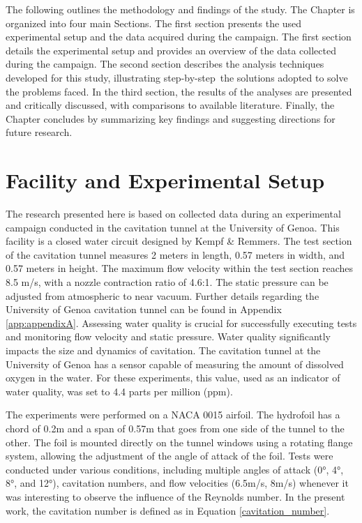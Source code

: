 The following outlines the methodology and findings of the study. The Chapter is organized into four main Sections. The first section presents the used experimental setup and the data acquired during the campaign. The first section details the experimental setup and provides an overview of the data collected during the campaign. The second section describes the analysis techniques developed for this study, illustrating step-by-step the solutions adopted to solve the problems faced. In the third section, the results of the analyses are presented and critically discussed, with comparisons to available literature. Finally, the Chapter concludes by summarizing key findings and suggesting directions for future research.

\section{Facility and Experimental Setup}
\label{sez:setup1}

The research presented here is based on collected data during an experimental campaign conducted in the cavitation tunnel at the University of Genoa. This facility is a closed water circuit designed by Kempf \& Remmers. 
The test section of the cavitation tunnel measures 2 meters in length, 0.57 meters in width, and 0.57 meters in height. The maximum flow velocity within the test section reaches 8.5 m/s, with a nozzle contraction ratio of 4.6:1. The static pressure can be adjusted from atmospheric to near vacuum.
Further details regarding the University of Genoa cavitation tunnel can be found in Appendix \ref{app:appendixA}.
Assessing water quality is crucial for successfully executing tests and monitoring flow velocity and static pressure. Water quality significantly impacts the size and dynamics of cavitation. The cavitation tunnel at the University of Genoa has a sensor capable of measuring the amount of dissolved oxygen in the water. For these experiments, this value, used as an indicator of water quality, was set to 4.4 parts per million (ppm).

The experiments were performed on a NACA 0015 airfoil. The hydrofoil has a chord of 0.2m and a span of 0.57m that goes from one side of the tunnel to the other. The foil is mounted directly on the tunnel windows using a rotating flange system, allowing the adjustment of the angle of attack of the foil.
Tests were conducted under various conditions, including multiple angles of attack (0°, 4°, 8°, and 12°), cavitation numbers, and flow velocities (6.5m/s, 8m/s) whenever it was interesting to observe the influence of the Reynolds number.
In the present work, the cavitation number is defined as in Equation \ref{cavitation_number}.

